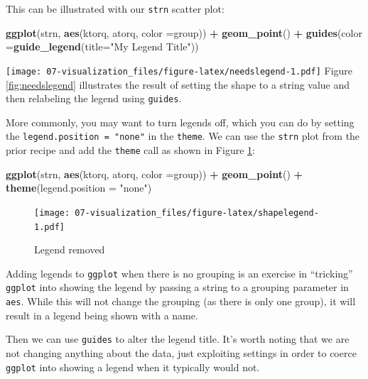 \documentclass[
]{book}
\newenvironment{Shaded}{\begin{snugshade}}{\end{snugshade}}
\newcommand{\DataTypeTok}[1]{\textcolor[rgb]{0.13,0.29,0.53}{#1}}
\newcommand{\KeywordTok}[1]{\textcolor[rgb]{0.13,0.29,0.53}{\textbf{#1}}}
\newcommand{\NormalTok}[1]{#1}
\newcommand{\OperatorTok}[1]{\textcolor[rgb]{0.81,0.36,0.00}{\textbf{#1}}}
\newcommand{\StringTok}[1]{\textcolor[rgb]{0.31,0.60,0.02}{#1}}
\begin{document}
This can be illustrated with our \texttt{strn} scatter plot:

\begin{Shaded}
\begin{Highlighting}[]
\KeywordTok{ggplot}\NormalTok{(strn, }\KeywordTok{aes}\NormalTok{(ktorq, atorq, }\DataTypeTok{color =}\NormalTok{group)) }\OperatorTok{+}
\StringTok{  }\KeywordTok{geom_point}\NormalTok{() }\OperatorTok{+}
\StringTok{  }\KeywordTok{guides}\NormalTok{(}\DataTypeTok{color =}\KeywordTok{guide_legend}\NormalTok{(}\DataTypeTok{title=}\StringTok{"My Legend Title"}\NormalTok{)) }
\end{Highlighting}
\end{Shaded}

\texttt{[image: 07-visualization\_files/figure-latex/needslegend-1.pdf]}
Figure \ref{fig:needslegend} illustrates the result of setting the shape to a string value and then relabeling the legend using \texttt{guides}.

More commonly, you may want to turn legends off, which you can do by setting the \texttt{legend.position\ =\ "none"} in the \texttt{theme}. We can use the \texttt{strn} plot from the prior recipe and add the \texttt{theme} call as shown in Figure \ref{fig:shapelegend}:

\begin{Shaded}
\begin{Highlighting}[]
\KeywordTok{ggplot}\NormalTok{(strn, }\KeywordTok{aes}\NormalTok{(ktorq, atorq, }\DataTypeTok{color =}\NormalTok{group)) }\OperatorTok{+}
\StringTok{  }\KeywordTok{geom_point}\NormalTok{() }\OperatorTok{+}
\StringTok{  }\KeywordTok{theme}\NormalTok{(}\DataTypeTok{legend.position =} \StringTok{"none"}\NormalTok{)}
\end{Highlighting}
\end{Shaded}

\begin{figure}
\centering
\texttt{[image: 07-visualization\_files/figure-latex/shapelegend-1.pdf]}
\caption{\label{fig:shapelegend}Legend removed}
\end{figure}

Adding legends to \texttt{ggplot} when there is no grouping is an exercise in ``tricking'' \texttt{ggplot} into showing the legend by passing a string to a grouping parameter in \texttt{aes}. While this will not change the grouping (as there is only one group), it will result in a legend being shown with a name.

Then we can use \texttt{guides} to alter the legend title. It's worth noting that we are not changing anything about the data, just exploiting settings in order to coerce \texttt{ggplot} into showing a legend when it typically would not.
\end{document}
